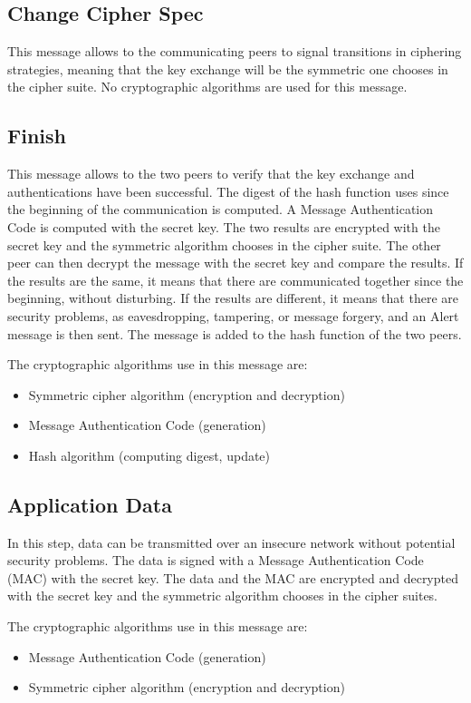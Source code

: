 \subsection*{Change Cipher Spec}
This message allows to the communicating peers to signal transitions in
ciphering strategies, meaning that the key exchange will be the symmetric one
chooses in the cipher suite.
No cryptographic algorithms are used for this message.


\subsection*{Finish}
This message allows to the two peers to verify that the key exchange and
authentications have been successful. The digest of the hash function uses since
the beginning of the communication is computed. A Message Authentication Code is
computed with the secret key.
The two results are encrypted with the secret key and the symmetric algorithm
chooses in the cipher suite.
The other peer can then decrypt the message with the secret key and compare
the results. If the results are the same, it means that there are communicated
together since the beginning, without disturbing. If the results are different,
it means that there are security problems, as eavesdropping, tampering, or
message forgery, and an Alert message is then sent. The message is added to the
hash function of the two peers.

The cryptographic algorithms use in this message are:
\begin{itemize}[noitemsep]
  \item Symmetric cipher algorithm (encryption and decryption)
  \item Message Authentication Code (generation)
  \item Hash algorithm (computing digest, update)
\end{itemize}



\subsection*{Application Data}
In this step, data can be transmitted over an insecure network without potential
security problems.
The data is signed with a Message Authentication Code (MAC) with the secret
key.
The data and the MAC are encrypted and decrypted with the secret key and the
symmetric algorithm chooses in the cipher suites.

The cryptographic algorithms use in this message are:
\begin{itemize}[noitemsep]
  \item Message Authentication Code (generation)
  \item Symmetric cipher algorithm (encryption and decryption)
\end{itemize}
